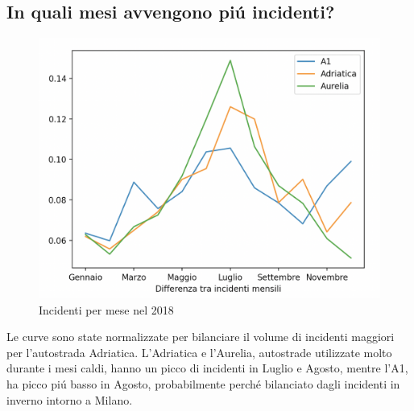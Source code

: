 \documentclass[a4paper]{report}
\begin{document}
\subsection{In quali mesi avvengono pi\'u incidenti?}
\begin{figure}[!ht]
    \includegraphics[width=\linewidth]{../src/incidenti/incidenti_aci/mesi_autostrade.png}
    \caption{Incidenti per mese nel 2018}
    \label{fig:incidenti_per_mese}
\end{figure}

Le curve sono state normalizzate per bilanciare il volume di incidenti maggiori per 
l'autostrada Adriatica.
L'Adriatica e l'Aurelia, autostrade utilizzate molto durante i mesi caldi, hanno un picco di 
incidenti in Luglio e Agosto, mentre l'A1, ha picco pi\'u basso in Agosto, probabilmente 
perch\'e bilanciato dagli incidenti in inverno intorno a Milano.
\end{document}
